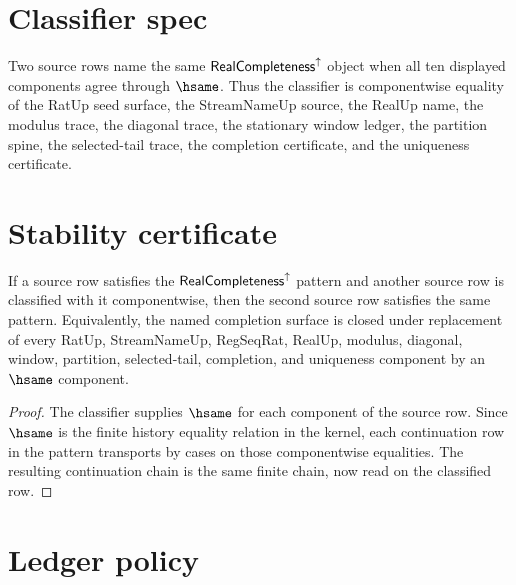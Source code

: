 \section{Classifier spec}
\label{sec:concrete-instances-real-completeness-classifier}

\begin{definition}
\label{def:concrete-instances-real-completeness-classifier}
Two source rows name the same $\mathsf{RealCompleteness}^{\uparrow}$ object when all ten displayed components agree through $\hsame$. Thus the classifier is componentwise equality of the RatUp seed surface, the StreamNameUp source, the RealUp name, the modulus trace, the diagonal trace, the stationary window ledger, the partition spine, the selected-tail trace, the completion certificate, and the uniqueness certificate.
\end{definition}

\section{Stability certificate}
\label{sec:concrete-instances-real-completeness-stability}

\begin{theorem}
\label{thm:concrete-instances-real-completeness-stability}
If a source row satisfies the $\mathsf{RealCompleteness}^{\uparrow}$ pattern and another source row is classified with it componentwise, then the second source row satisfies the same pattern. Equivalently, the named completion surface is closed under replacement of every RatUp, StreamNameUp, RegSeqRat, RealUp, modulus, diagonal, window, partition, selected-tail, completion, and uniqueness component by an $\hsame$ component.
\end{theorem}
\begin{proof}
The classifier supplies $\hsame$ for each component of the source row. Since $\hsame$ is the finite history equality relation in the kernel, each continuation row in the pattern transports by cases on those componentwise equalities. The resulting continuation chain is the same finite chain, now read on the classified row.
\end{proof}

\section{Ledger policy}
\label{sec:concrete-instances-real-completeness-ledger}

